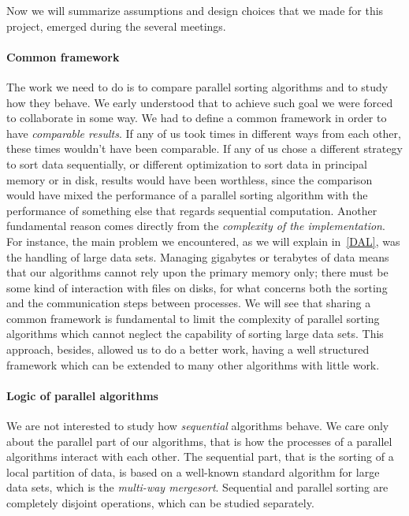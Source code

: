 Now we will summarize assumptions and design choices that we made for this project, emerged during the several meetings. 

\paragraph{Common framework} The work we need to do is to compare parallel sorting algorithms and to study how they behave. We early understood that to achieve such goal we were forced to collaborate in some way. We had to define a common framework in order to have \textit{comparable results}. If any of us took times in different ways from each other, these times wouldn't have been comparable. If any of us chose a different strategy to sort data sequentially, or different optimization to sort data in principal memory or in disk, results would have been worthless, since the comparison would have mixed the performance of a parallel sorting algorithm with the performance of something else that regards sequential computation. Another fundamental reason comes directly from the \textit{complexity of the implementation}. For instance, the main problem we encountered, as we will explain in~\ref{DAL}, was the handling of large data sets. Managing gigabytes or terabytes of data means that our algorithms cannot rely upon the primary memory only; there must be some kind of interaction with files on disks, for what concerns both the sorting and the communication steps between processes. We will see that sharing a common framework is fundamental to limit the complexity of parallel sorting algorithms which cannot neglect the capability of sorting large data sets. This approach, besides, allowed us to do a better work, having a well structured framework which can be extended to many other algorithms with little work.

\paragraph{Logic of parallel algorithms} We are not interested to study how \textit{sequential} algorithms behave. We care only about the parallel part of our algorithms, that is how the processes of a parallel algorithms interact with each other. The sequential part, that is the sorting of a local partition of data, is based on a well-known standard algorithm for large data sets, which is the \textit{multi-way mergesort}. Sequential and parallel sorting are completely disjoint operations, which can be studied separately.

